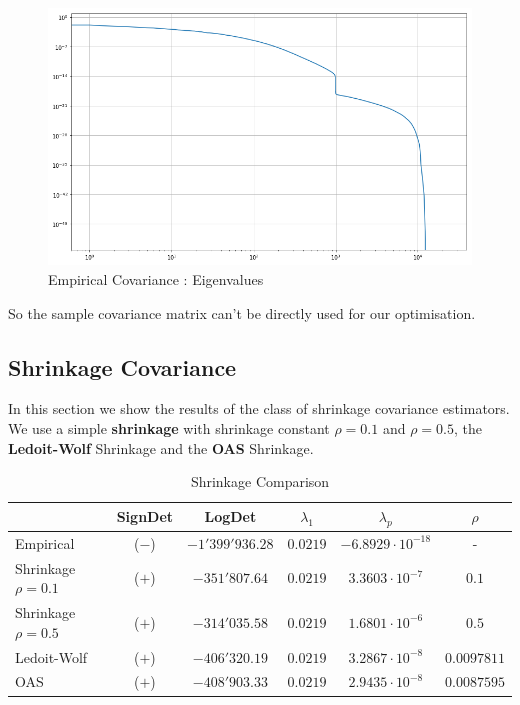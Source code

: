 \begin{figure}[h!]
\centering
    \includegraphics[width=0.8\linewidth]{figures/Covariance/Tracer_23643/cov_emp_eigenval_loglog}
    \caption{Empirical Covariance : Eigenvalues}
    \label{fig:cov:emp:eigs}
\end{figure}

So the sample covariance matrix can't be directly used for our optimisation.  

\subsection{Shrinkage Covariance}

In this section we show the results of the class of shrinkage covariance estimators. We use a simple \textbf{shrinkage} with shrinkage constant $\rho = 0.1$ and $\rho = 0.5$,  the \textbf{Ledoit-Wolf} Shrinkage and the \textbf{OAS} Shrinkage. 

\begin{table}[h]
\centering
    \begin{tabular}{|l|ccccc|}
     \hline
        & SignDet & LogDet & $\lambda_1$ & $\lambda_p$ & $\rho$ \\ \hline
        Empirical & ($-$) & $-1'399'936.28$ &  $0.0219$ & $-6.8929 \cdot 10^{-18}$ & -\\
        Shrinkage $\rho=0.1$ & ($+$) & $-351'807.64$ &  $0.0219$ &$3.3603\cdot 10^{-7}$ & $0.1$\\
        Shrinkage $\rho=0.5$ & ($+$) & $-314'035.58$ &  $0.0219$  &$1.6801 \cdot 10^{-6}$ & $0.5$\\
        Ledoit-Wolf & ($+$) & $-406'320.19$&  $0.0219$ & $3.2867\cdot 10^{-8}$ & $0.0097811$\\
        OAS & ($+$) & $-408'903.33$ & $0.0219$ & $2.9435\cdot 10^{-8}$ & $0.0087595$ \\  \hline
    \end{tabular}
    \caption{Shrinkage Comparison}
\end{table}

